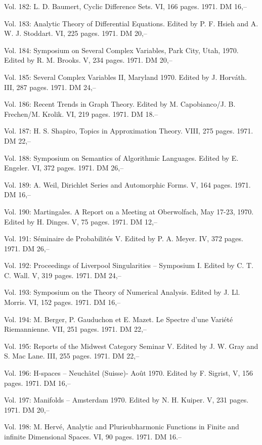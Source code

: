 Vol. 182: L. D. Baumert, Cyclic Difference Sets. VI, 166 pages. 1971. DM 16,--

Vol. 183: Analytic Theory of Differential Equations. Edited by P. F. Hsieh and A. W. J. Stoddart. VI, 225 pages. 1971. DM 20,--

Vol. 184: Symposium on Several Complex Variables, Park City, Utah, 1970. Edited by R. M. Brooks. V, 234 pages. 1971. DM 20,--

Vol. 185: Several Complex Variables II, Maryland 1970. Edited by J. Horváth. III, 287 pages. 1971. DM 24,--

Vol. 186: Recent Trends in Graph Theory. Edited by M. Capobianco/J. B. Frechen/M. Krolik. VI, 219 pages. 1971. DM 18.--

Vol. 187: H. S. Shapiro, Topics in Approximation Theory. VIII, 275 pages. 1971. DM 22,--

Vol. 188: Symposium on Semantics of Algorithmic Languages. Edited by E. Engeler. VI, 372 pages. 1971. DM 26,--

Vol. 189: A. Weil, Dirichlet Series and Automorphic Forms. V, 164 pages. 1971. DM 16,--

Vol. 190: Martingales. A Report on a Meeting at Oberwolfach, May 17-23, 1970. Edited by H. Dinges. V, 75 pages. 1971. DM 12,--

Vol. 191: Séminaire de Probabilités V. Edited by P. A. Meyer. IV, 372 pages. 1971. DM 26,--

Vol. 192: Proceedings of Liverpool Singularities -- Symposium I. Edited by C. T. C. Wall. V, 319 pages. 1971. DM 24,--

Vol. 193: Symposium on the Theory of Numerical Analysis. Edited by J. Ll. Morris. VI, 152 pages. 1971. DM 16,--

Vol. 194: M. Berger, P. Gauduchon et E. Mazet. Le Spectre d'une Variété Riemannienne. VII, 251 pages. 1971. DM 22,--

Vol. 195: Reports of the Midwest Category Seminar V. Edited by J. W. Gray and S. Mac Lane. III, 255 pages. 1971. DM 22,--

Vol. 196: H-spaces -- Neuchâtel (Suisse)- Août 1970. Edited by F. Sigrist, V, 156 pages. 1971. DM 16,--

Vol. 197: Manifolds -- Amsterdam 1970. Edited by N. H. Kuiper. V, 231 pages. 1971. DM 20,--

Vol. 198: M. Hervé, Analytic and Plurisubharmonic Functions in Finite and infinite Dimensional Spaces. VI, 90 pages. 1971. DM 16.--

